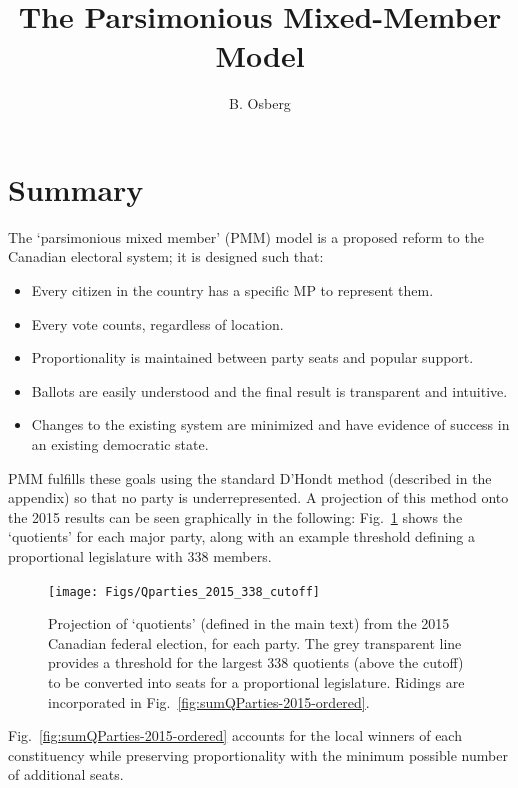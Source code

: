 \documentclass[DIV=calc, paper=a4, fontsize=11pt, twocolumn]{scrartcl}	 %
\title{The Parsimonious Mixed-Member Model} %
\author{B. Osberg} %
\date{} %
\begin{document}
\thispagestyle{fancy} %

\section*{Summary}
\renewcommand{\thefigure}{S-\arabic{figure}}

The `parsimonious mixed member' (PMM) model is a proposed reform to the Canadian electoral system; it is designed such that:

\begin{itemize}
\item Every citizen in the country has a specific MP to represent them.  
\item Every vote counts, regardless of location. 
\item Proportionality is maintained between party seats and popular support. 
\item Ballots are easily understood and the final result is transparent and intuitive.
\item Changes to the existing system are minimized and have evidence of success in an existing democratic state.
\end{itemize}

PMM fulfills these goals using the standard D'Hondt method (described in the appendix) so that no party is underrepresented. A projection of this method onto the 2015 results can be seen graphically in the following: Fig.~\ref{fig:sumQParties-2015-338-cutoff} shows the `quotients' for each major party, along with an example threshold defining a proportional legislature with 338 members. 
\begin{figure}[h!]
  \texttt{[image: Figs/Qparties\_2015\_338\_cutoff]}
  \caption{Projection of `quotients' (defined in the main text) from the 2015 Canadian federal election, for each party. The grey transparent line provides a threshold for the largest 338 quotients (above the cutoff) to be converted into seats for a proportional legislature. Ridings are incorporated in Fig.~\ref{fig:sumQParties-2015-ordered}. }
\label{fig:sumQParties-2015-338-cutoff}
\end{figure}

Fig.~\ref{fig:sumQParties-2015-ordered} accounts for the local winners of each constituency while preserving proportionality with the minimum possible number of additional seats.
\end{document}
